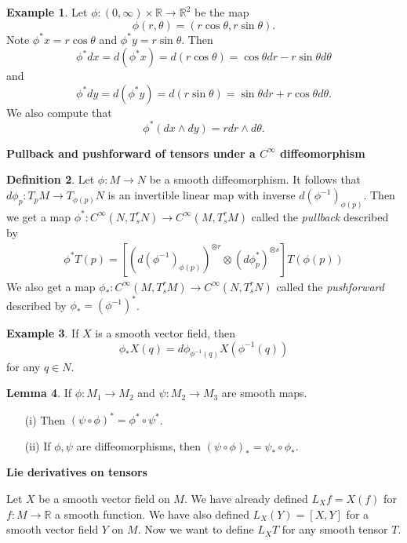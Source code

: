 \documentclass{amsart}
\numberwithin{equation}{section}
\theoremstyle{definition}
\newtheorem{definition}{Definition} [section]
\newtheorem{example}[definition]{Example}
\theoremstyle{theorem}
\newtheorem{lemma}[definition]{Lemma}
\begin{document}
\begin{example}
Let $\phi : (0,\infty) \times \mathbb{R} \to \mathbb{R}^2$ be the map 
\[
\phi(r,\theta) = (r \cos \theta, r \sin \theta). 
\]
Note $\phi^*x = r\cos\theta$ and $\phi^*y = r\sin\theta$. Then 
\[
\phi^*dx = d(\phi^*x) = d(r\cos \theta) = \cos\theta dr - r \sin \theta d\theta
\]
and 
\[
\phi^*dy = d(\phi^*y) = d(r \sin\theta) = \sin\theta dr + r \cos\theta d\theta.
\]
We also compute that 
\[
\phi^*(dx \wedge dy) = r dr \wedge d\theta. 
\]
\end{example}

\noindent
{\bf \large Pullback and pushforward of tensors under
a $C^\infty$ diffeomorphism}

\begin{definition}
Let $\phi : M \to N$ be a smooth diffeomorphism. It follows that $d\phi_p : T_pM \to T_{\phi(p)}N$ is an invertible linear map with inverse $d(\phi^{-1})_{\phi(p)}$. Then we get a map 
$\phi^* : C^\infty(N,T^r_sN) \to C^\infty(M, T^r_sM)$ called the {\em pullback} described by 
\begin{align*}
\phi^*T(p) = [(d(\phi^{-1})_{\phi(p)})^{\otimes r} \otimes (d\phi_p^*)^{\otimes s}]T(\phi(p))
\end{align*}
We also get a map $\phi_* : C^\infty(M, T^r_sM) \to C^\infty(N, T^r_sN)$ called the {\em pushforward} described by $\phi_* = (\phi^{-1})^*$. 
\end{definition}

\begin{example}
If $X$ is a smooth vector field, then 
\[
\phi_*X(q) = d\phi_{\phi^{-1}(q)}X(\phi^{-1}(q))
\]
for any $q \in N$. 
\end{example}

\begin{lemma}
If $\phi : M_1 \to M_2$ and $\psi :M_2 \to M_3$ are smooth maps. 
\begin{enumerate}
\item[(i)] Then $(\psi \circ \phi)^* = \phi^* \circ \psi^*$. 
\item[(ii)] If $\phi,\psi$ are diffeomorphisms, then $(\psi \circ \phi)_* = \psi_* \circ \phi_*$. 
\end{enumerate}
\end{lemma}

\noindent
{\large \bf Lie derivatives on tensors}

Let $X$ be a smooth vector field on $M$. We have already defined $L_Xf = X(f)$ for $f : M \to \mathbb{R}$ a smooth function. We have also defined $L_X(Y) = [X,Y]$ for a smooth vector field $Y$ on $M$. Now we want to define $L_XT$ for any smooth tensor $T$. 
\end{document}
